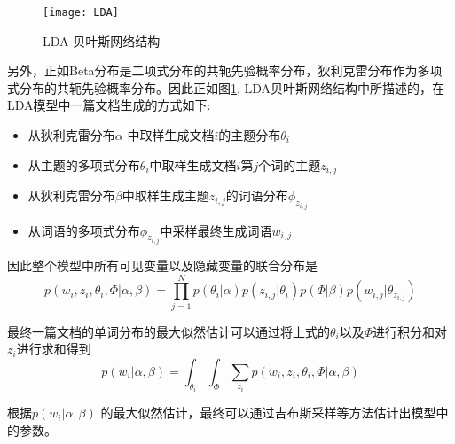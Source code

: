 \begin{figure}[htbp]
	\begin{center}
		\texttt{[image: LDA]}
		\caption{LDA 贝叶斯网络结构}
		\label{gra4}
	\end{center}
\end{figure}

另外，正如Beta分布是二项式分布的共轭先验概率分布，狄利克雷分布作为多项式分布的共轭先验概率分布。因此正如图\ref{gra4}, LDA贝叶斯网络结构中所描述的，在LDA模型中一篇文档生成的方式如下:
\begin{itemize}
	\item 从狄利克雷分布$\alpha$ 中取样生成文档$i$的主题分布$\theta_i$
	\item 从主题的多项式分布$\theta_i$中取样生成文档$i$第$j$个词的主题$z_{i, j}$
	\item 从狄利克雷分布$\beta $中取样生成主题$z_{i, j}$的词语分布$\phi_{z_{i, j}}$
	\item 从词语的多项式分布$\phi_{z_{i, j}}$中采样最终生成词语$w_{i, j}$
\end{itemize}
因此整个模型中所有可见变量以及隐藏变量的联合分布是
\begin{equation}
p(w_i, z_i, \theta_i, \Phi | \alpha, \beta) = \prod_{j = 1}^{N} p(\theta_i|\alpha)p(z_{i, j}|\theta_i)p(\Phi|\beta)p(w_{i, j}|\theta_{z_{i, j}})
\end{equation}


最终一篇文档的单词分布的最大似然估计可以通过将上式的$\theta_i$以及$\Phi$进行积分和对$z_i$进行求和得到
\begin{equation}
p(w_i | \alpha, \beta)  = \int_{\theta_i}\int_{\Phi }\sum_{z_i}p(w_i, z_i, \theta_i, \Phi | \alpha, \beta) 
\end{equation}


根据$p(w_i | \alpha, \beta)$ 的最大似然估计，最终可以通过吉布斯采样等方法估计出模型中的参数。


